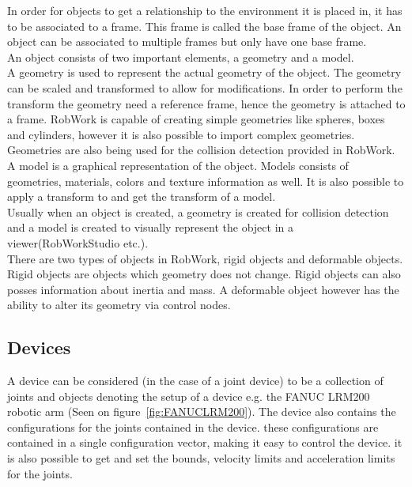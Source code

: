 In order for objects to get a relationship to the environment it is placed in, it has to be associated to a frame. This frame is called the base frame of the object. An object can be associated to multiple frames but only have one base frame.\\

An object consists of two important elements, a geometry and a model.\\
A geometry is used to represent the actual geometry of the object. The geometry can be scaled and transformed to allow for modifications. In order to perform the transform the geometry need a reference frame, hence the geometry is attached to a frame. RobWork is capable of creating simple geometries like spheres, boxes and cylinders, however it is also possible to import complex geometries. Geometries are also being used for the collision detection provided in RobWork.\\
A model is a graphical representation of the object. Models consists of geometries, materials, colors and texture information as well. It is also possible to apply a transform to and get the transform of a model.\\
Usually when an object is created, a geometry is created for collision detection and a model is created to visually represent the object in a viewer(RobWorkStudio etc.).\\

There are two types of objects in RobWork, rigid objects and deformable objects. Rigid objects are objects which  geometry does not change. Rigid objects can also posses information about inertia and mass. A deformable object however has the ability to alter its geometry via control nodes.


\subsection{Devices}
A device can be considered (in the case of a joint device) to be a collection of joints and objects denoting the setup of a device e.g. the FANUC LRM200 robotic arm (Seen on figure~\ref{fig:FANUCLRM200}). The device also contains the configurations for the joints contained in the device. these configurations are contained in a single configuration vector, making it easy to control the device. it is also possible to get and set the bounds, velocity limits and acceleration limits for the joints.\\

